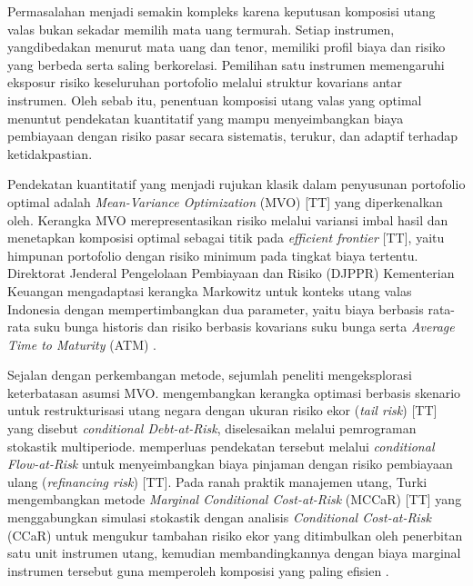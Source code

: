 Permasalahan menjadi semakin kompleks karena keputusan komposisi utang valas bukan sekadar memilih mata uang termurah. Setiap instrumen, yangdibedakan menurut mata uang dan tenor, memiliki profil biaya dan risiko yang berbeda serta saling berkorelasi. Pemilihan satu instrumen memengaruhi eksposur risiko keseluruhan portofolio melalui struktur kovarians antar instrumen. Oleh sebab itu, penentuan komposisi utang valas yang optimal menuntut pendekatan kuantitatif yang mampu menyeimbangkan biaya pembiayaan dengan risiko pasar secara sistematis, terukur, dan adaptif terhadap ketidakpastian.

Pendekatan kuantitatif yang menjadi rujukan klasik dalam penyusunan portofolio optimal adalah \textit{Mean-Variance Optimization} (MVO) [TT] yang diperkenalkan oleh. Kerangka MVO merepresentasikan risiko melalui variansi imbal hasil dan menetapkan komposisi optimal sebagai titik pada \textit{efficient frontier} [TT], yaitu himpunan portofolio dengan risiko minimum pada tingkat biaya tertentu. Direktorat Jenderal Pengelolaan Pembiayaan dan Risiko (DJPPR) Kementerian Keuangan mengadaptasi kerangka Markowitz untuk konteks utang valas Indonesia dengan mempertimbangkan dua parameter, yaitu biaya berbasis rata-rata suku bunga historis dan risiko berbasis kovarians suku bunga serta \textit{Average Time to Maturity} (ATM) .

Sejalan dengan perkembangan metode, sejumlah peneliti mengeksplorasi keterbatasan asumsi MVO.  mengembangkan kerangka optimasi berbasis skenario untuk restrukturisasi utang negara dengan ukuran risiko ekor (\textit{tail risk}) [TT] yang disebut \textit{conditional Debt-at-Risk}, diselesaikan melalui pemrograman stokastik multiperiode.  memperluas pendekatan tersebut melalui \textit{conditional Flow-at-Risk} untuk menyeimbangkan biaya pinjaman dengan risiko pembiayaan ulang (\textit{refinancing risk}) [TT]. Pada ranah praktik manajemen utang, Turki mengembangkan metode \textit{Marginal Conditional Cost-at-Risk} (MCCaR) [TT] yang menggabungkan simulasi stokastik dengan analisis \textit{Conditional Cost-at-Risk} (CCaR) untuk mengukur tambahan risiko ekor yang ditimbulkan oleh penerbitan satu unit instrumen utang, kemudian membandingkannya dengan biaya marginal instrumen tersebut guna memperoleh komposisi yang paling efisien .

